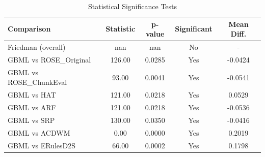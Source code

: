 \begin{table}[htbp]
\centering
\caption{Statistical Significance Tests}
\label{tab:statistical_tests}
\begin{tabular}{lcccc}
\toprule
Comparison & Statistic & p-value & Significant & Mean Diff. \\
\midrule
Friedman (overall) & nan & nan & No & - \\
\midrule
GBML vs ROSE_Original & 126.00 & 0.0285 & Yes & -0.0424 \\
GBML vs ROSE_ChunkEval & 93.00 & 0.0041 & Yes & -0.0541 \\
GBML vs HAT & 121.00 & 0.0218 & Yes & 0.0529 \\
GBML vs ARF & 121.00 & 0.0218 & Yes & -0.0536 \\
GBML vs SRP & 130.00 & 0.0350 & Yes & -0.0416 \\
GBML vs ACDWM & 0.00 & 0.0000 & Yes & 0.2019 \\
GBML vs ERulesD2S & 66.00 & 0.0002 & Yes & 0.1798 \\
\bottomrule
\end{tabular}
\end{table}
